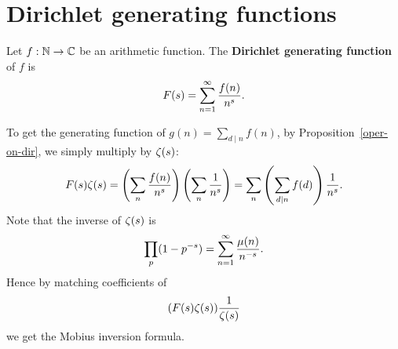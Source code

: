 \section{Dirichlet generating functions}
\begin{df}
Let $f:\mathbb{N}\to \mathbb{C}$ be an arithmetic function.
The \textbf{Dirichlet generating function} of $f$ is
\[
F(s)=\sum_{n=1}^{\infty} \frac{f(n)}{n^s}.
\]
\end{df}
To get the generating function of $g(n)=\sum_{d\mid n} f(n)$, by Proposition~\ref{oper-on-dir}, we simply multiply by $\zeta(s)$: 
\[
F(s)\zeta(s)=\left( {\sum_{n}\frac{f(n)}{n^s}} \right)\left( {\sum_{n}\frac{1}{n^s}} \right)=\sum_{n}\left( {\sum_{d\mid n} f(d)} \right)\frac{1}{n^s}.
\]
Note that the inverse of $\zeta(s)$ is
\[
\prod_{p}(1-p^{-s})=\sum_{n=1}^{\infty} \frac{\mu(n)}{n^{-s}}.
\]
Hence by matching coefficients of
\[
(F(s)\zeta(s))\frac{1}{\zeta(s)}
\]
we get the Mobius inversion formula.

